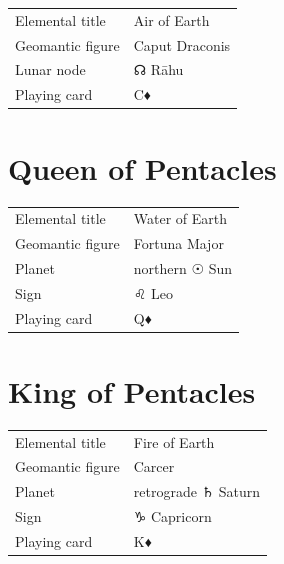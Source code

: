 \vspace{4mm}
\noindent\begin{tabular}{@{}l@{\quad}l@{}}
Elemental title & Air of Earth \\
Geomantic figure & Caput Draconis \\
Lunar node & {\symbfont ☊} Rāhu \\
Playing card & C♦ \\
\end{tabular}

\newpage
\section*{Queen of Pentacles}

\begin{center}
\end{center}

\vspace{4mm}
\noindent\begin{tabular}{@{}l@{\quad}l@{}}
Elemental title & Water of Earth \\
Geomantic figure & Fortuna Major \\
Planet & northern {\symbfont ☉} Sun \\
Sign & {\symbfont ♌} Leo \\
Playing card & Q♦ \\
\end{tabular}

\newpage
\section*{King of Pentacles}

\begin{center}
\end{center}

\vspace{4mm}
\noindent\begin{tabular}{@{}l@{\quad}l@{}}
Elemental title & Fire of Earth \\
Geomantic figure & Carcer \\
Planet & retrograde {\symbfont ♄} Saturn \\
Sign & {\symbfont ♑} Capricorn \\
Playing card & K♦ \\
\end{tabular}

